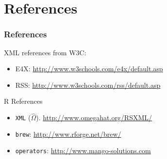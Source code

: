 \documentclass[smaller]{beamer}
\newcommand{\rfun}[1]{\texttt{#1}}
\begin{document}
{
 \begin{frame}[plain]
 \end{frame}
}



\begin{frame}[plain]

\end{frame}
 
\section{References}

\begin{frame}[fragile]
\frametitle{References}

XML references from W3C: 
\begin{itemize}
 \item E4X: \url{http://www.w3schools.com/e4x/default.asp}
 \item RSS: \url{http://www.w3schools.com/rss/default.asp}
\end{itemize}

R References
\begin{itemize}
 \item \rfun{XML} ($\hat{\Omega}$). \url{http://www.omegahat.org/RSXML/}
 \item \rfun{brew}: \url{http://www.rforge.net/brew/}
 \item \rfun{operators}: \url{http://www.mango-solutions.com}
\end{itemize}

\end{frame}
\end{document}

